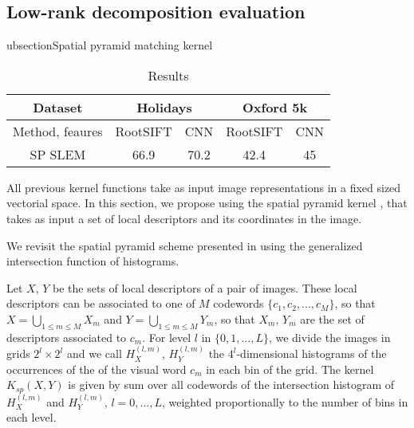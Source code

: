 \subsection{Low-rank decomposition evaluation}



ubsection{Spatial pyramid matching kernel}

\begin{table}[!h]
    \centering
    \begin{tabular}{|c|c|c|c|c|}
    \hline
    Dataset & \multicolumn{2}{|c|}{\textbf{Holidays}} & \multicolumn{2}{|c|}{\textbf{Oxford 5k}}\\
    \hline
        Method, feaures & RootSIFT & CNN & RootSIFT
        &CNN \\
    \hline
    \hline
        SP SLEM & 66.9 & 70.2 & 42.4 & 45 \\
    \hline
    \end{tabular}
    \caption{Results }
    \label{tab:spk}
\end{table}
All previous kernel functions take as input image representations in a fixed sized vectorial space. In this section, we propose using the spatial pyramid kernel \cite{GrauDa05}, that takes as input a set of local descriptors and its coordinates in the image.

We revisit the spatial pyramid scheme presented in \cite{spk} using the generalized intersection function of histograms. 

Let $X$, $Y$ be the sets of local descriptors of a pair of images. 
These local descriptors can be associated to one of $M$ codewords $\{c_1,c_2,...,c_M\}$, so that $X=\bigcup_{1\leq m \leq M}X_m$ and $Y=\bigcup_{1\leq m \leq M}Y_m$, so that $X_m$, $Y_m$ are the set of descriptors associated to $c_m$. 
For level $l$ in $\{0,1,..., L\}$, we divide the images in grids $2^l\times 2^l$ and we call $H^{(l,m)}_X$, $H^{(l,m)}_Y$ the $4^l$-dimensional histograms of the occurrences of the of the visual word $c_m$ in each bin of the grid. 
The kernel $K_{sp}(X,Y)$ is given by sum over all codewords of the intersection histogram of $H^{(l,m)}_X$ and $H^{(l,m)}_Y$, $l=0,...,L$,  weighted proportionally to the number of bins in each level.

